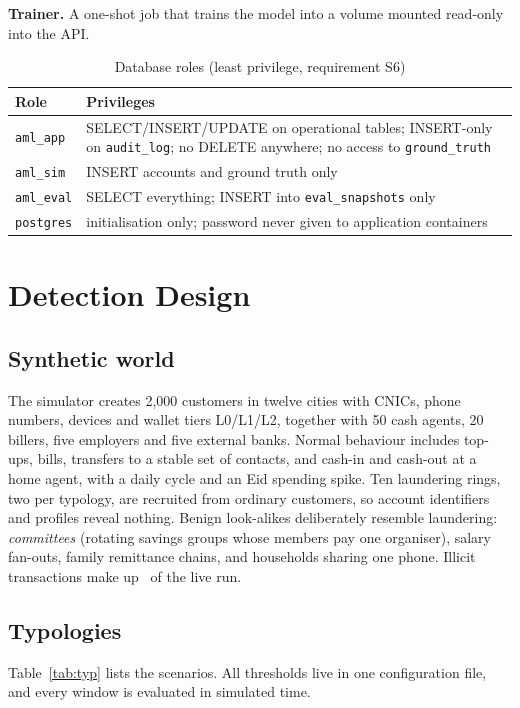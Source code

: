 \documentclass[conference,10pt]{IEEEtran}
\newcommand{\tbl}{\scriptsize\renewcommand{\arraystretch}{1.12}}
\newcommand{\code}[1]{\texttt{\small #1}}
\begin{document}
\textbf{Trainer.} A one-shot job that trains the model into a volume mounted read-only into the API.

\begin{table}[t]
\caption{Database roles (least privilege, requirement S6)}\label{tab:roles}
\centering\tbl
\begin{tabularx}{\columnwidth}{@{}lL@{}}
\toprule
Role & Privileges \\ \midrule
\code{aml\_app}  & SELECT/INSERT/UPDATE on operational tables; INSERT-only on \code{audit\_log}; no DELETE anywhere; no access to \code{ground\_truth} \\
\code{aml\_sim}  & INSERT accounts and ground truth only \\
\code{aml\_eval} & SELECT everything; INSERT into \code{eval\_snapshots} only \\
\code{postgres}  & initialisation only; password never given to application containers \\
\bottomrule
\end{tabularx}
\end{table}

\section{Detection Design}\label{sec:world}

\subsection{Synthetic world}
The simulator creates 2,000 customers in twelve cities with CNICs, phone numbers, devices and
wallet tiers L0/L1/L2, together with 50 cash agents, 20 billers, five employers and five external
banks. Normal behaviour includes top-ups, bills, transfers to a stable set of contacts, and cash-in
and cash-out at a home agent, with a daily cycle and an Eid spending spike. Ten laundering rings,
two per typology, are recruited from ordinary customers, so account identifiers and profiles reveal
nothing. Benign look-alikes deliberately resemble laundering: \emph{committees} (rotating savings
groups whose members pay one organiser), salary fan-outs, family remittance chains, and households
sharing one phone. Illicit transactions make up \ResIllicitPct\ of the live run.

\subsection{Typologies}
Table~\ref{tab:typ} lists the scenarios. All thresholds live in one configuration file, and every
window is evaluated in simulated time.
\end{document}
